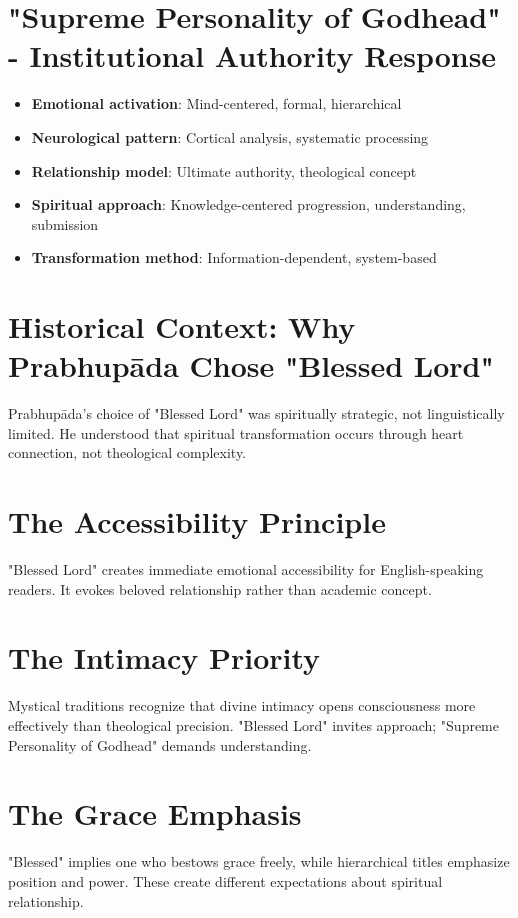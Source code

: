 \documentclass[11pt,twoside]{book}
\begin{document}
\section*{"Supreme Personality of Godhead" - Institutional Authority Response}
\label{sec:orge7c9f0c}
\begin{itemize}
\item \textbf{\textbf{Emotional activation}}: Mind-centered, formal, hierarchical
\item \textbf{\textbf{Neurological pattern}}: Cortical analysis, systematic processing
\item \textbf{\textbf{Relationship model}}: Ultimate authority, theological concept
\item \textbf{\textbf{Spiritual approach}}: Knowledge-centered progression, understanding, submission
\item \textbf{\textbf{Transformation method}}: Information-dependent, system-based
\end{itemize}
\section*{Historical Context: Why Prabhupāda Chose "Blessed Lord"}
\label{sec:org5f8ae6a}

Prabhupāda's choice of "Blessed Lord" was spiritually strategic, not linguistically limited. He understood that spiritual transformation occurs through heart connection, not theological complexity.
\section*{The Accessibility Principle}
\label{sec:orgd837ff0}
"Blessed Lord" creates immediate emotional accessibility for English-speaking readers. It evokes beloved relationship rather than academic concept.
\section*{The Intimacy Priority}
\label{sec:org3bfe463}
Mystical traditions recognize that divine intimacy opens consciousness more effectively than theological precision. "Blessed Lord" invites approach; "Supreme Personality of Godhead" demands understanding.
\section*{The Grace Emphasis}
\label{sec:org38b0ae5}
"Blessed" implies one who bestows grace freely, while hierarchical titles emphasize position and power. These create different expectations about spiritual relationship.
\end{document}
